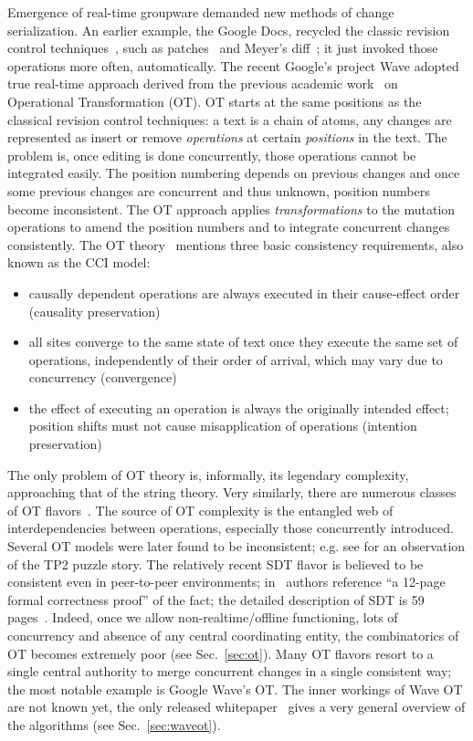 \documentclass{sig-alternate}
\newenvironment{tightitem}{
\begin{itemize}
  \setlength{\itemsep}{1pt}
  \setlength{\parskip}{0pt}
  \setlength{\parsep}{0pt}}{\end{itemize}
}
\begin{document}
Emergence of real-time groupware demanded new methods of change serialization.
An earlier example, the Google Docs, recycled the classic revision control techniques~\cite{diff-match-patch}, such as patches~\cite{patch} and Meyer's diff~\cite{meyers-diff}; it just invoked those operations more often, automatically.
The recent Google's project Wave adopted true real-time approach derived from the previous academic work~\cite{jupiter} on Operational Transformation (OT).
OT starts at the same positions as the classical revision control techniques: a text is a chain of atoms, any changes are represented as insert or remove \emph{operations} at certain \emph{positions} in the
text.
The problem is, once editing is done concurrently, those operations cannot be integrated easily.
The position numbering depends on previous changes and once some previous changes are concurrent and thus unknown, position numbers become inconsistent.
The OT approach applies \emph{transformations} to the mutation operations to amend the position numbers and to integrate concurrent changes consistently. The OT theory~\cite{sun-achieving} mentions three basic consistency requirements, also known as the CCI model: 
\begin{tightitem}
\item causally dependent operations are always executed in their cause-effect order (causality preservation)
\item all sites converge to the same state of text once they execute the same set of operations, independently of their order of arrival, which may vary due to concurrency (convergence)
\item the effect of executing an operation is always the originally intended effect; position shifts must not cause misapplication of operations (intention preservation)
\end{tightitem}
The only problem of OT theory is, informally, its legendary complexity, approaching that of the string theory.
Very similarly, there are numerous classes of OT flavors~\cite{ot}.
The source of OT complexity is the entangled web of interdependencies between operations, especially those concurrently introduced.
Several OT models were later found to be inconsistent; e.g. see \cite{woot,molli-proving} for an observation of the TP2 puzzle story.
The relatively recent SDT flavor is believed to be consistent even in peer-to-peer environments; in~\cite{lili-preserving} authors reference ``a 12-page formal correctness proof'' of the fact; the detailed description of SDT is 59 pages~\cite{lili-ensuring}.
Indeed, once we allow non-realtime/offline functioning, lots of concurrency and absence of any central coordinating entity, the combinatorics of OT becomes extremely poor (see Sec.~\ref{sec:ot}).
Many OT flavors resort to a single central authority to merge concurrent changes in a single consistent way; the most notable example is Google Wave's OT.
The inner workings of Wave OT are not known yet, the only released whitepaper~\cite{waveot} gives a very general overview of the algorithms (see Sec.~\ref{sec:waveot}).
\end{document}
